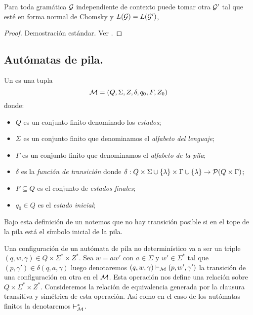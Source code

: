 \documentclass[tesis.tex]{subfiles}
\begin{document}
\begin{prop}
	Para toda gramática $\cal G$ independiente de contexto puede tomar otra $\cal G'$ tal que esté en forma normal de Chomsky y $L({\cal G}) = L(\cal G')$,
\end{prop}

\begin{proof}
	Demostración estándar. Ver \cite{hopcraft-ullman}.
\end{proof}

\subsection{Autómatas de pila.}

\begin{deff}
	Un  es una tupla 
	\[
	{\cal M } = (Q, \Sigma, Z, \delta, q_0, F, Z_0)
	\]
	 donde:
	\begin{itemize}
		\item $Q$ es un conjunto finito denominado los \emph{estados};
		\item $\Sigma$ es un conjunto finito que denominamos el \emph{alfabeto del lenguaje};
		\item $\Gamma$ es un conjunto finito que denominamos el \emph{alfabeto de la pila};
		\item $\delta$ es la \emph{función de transición} donde $\delta: Q  \times \Sigma \cup \{ \lambda \} \times \Gamma \cup \{ \lambda \} \to {\cal P}( Q  \times \Gamma)$;
		\item $F \subseteq Q$ es el conjunto de \emph{estados finales};
		\item $q_0 \in Q$ es el \emph{estado inicial};
	\end{itemize}
\end{deff}

\begin{obs}
	Bajo esta definición de un \APND notemos que no hay transición posible si en el tope de la pila está el símbolo inicial de la pila. 
\end{obs}


Una configuración de un autómata de pila no determinístico va a ser un triple $(q,w,\gamma) \in Q \times \Sigma^* \times Z^*$.
Sea $w = aw'$ con $a \in \Sigma$ y $w' \in \Sigma^*$ tal que $(p,\gamma') \in \delta (q,a,\gamma)$ luego denotaremos $(q,w,\gamma) \vdash_{\cal M} (p,w',\gamma')$ la transición de una configuración en otra en el \APND $\cal M$.
Esta operación nos define una relación sobre $Q \times \Sigma^* \times Z^*$.
Consideremos la relación de equivalencia generada por la clausura transitiva y simétrica de esta operación.
Así como en el caso de los autómatas finitos la denotaremos $\vdash^*_{\cal M}$.
\end{document}
